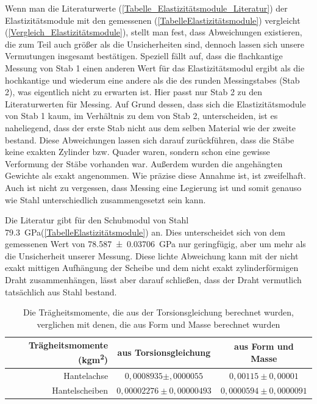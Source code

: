 \documentclass[
	a4paper,
	12pt,
	pagesize,
	ngerman
]{scrartcl}
\begin{document}
	Wenn man die Literaturwerte (\cref{Tabelle_Elastizitätsmodule_Literatur}) der Elastizitätsmodule mit den gemessenen (\cref{TabelleElastizitätsmodule}) vergleicht (\cref{Vergleich_Elastizitätsmodule}), stellt man fest, dass Abweichungen existieren, die zum Teil auch größer als die Unsicherheiten sind, dennoch lassen sich unsere Vermutungen insgesamt bestätigen. Speziell fällt auf, dass die flachkantige Messung von Stab 1 einen anderen Wert für das Elastizitätsmodul ergibt als die hochkantige und wiederum eine andere als die des runden Messingstabes (Stab 2), was eigentlich nicht zu erwarten ist. Hier passt nur Stab 2 zu den Literaturwerten für Messing. 
	Auf Grund dessen, dass sich die Elastizitätsmodule von Stab 1 kaum, im Verhältnis zu dem von Stab 2, unterscheiden, ist es naheliegend, dass der erste Stab nicht aus dem selben Material wie der zweite bestand.
	Diese Abweichungen lassen sich darauf zurückführen, dass die Stäbe keine exakten Zylinder bzw. Quader waren, sondern schon eine gewisse Verformung der Stäbe vorhanden war. Außerdem wurden die angehängten Gewichte als exakt angenommen. Wie präzise diese Annahme ist, ist zweifelhaft. Auch ist nicht zu vergessen, dass Messing eine Legierung ist und somit genauso wie Stahl unterschiedlich zusammengesetzt sein kann.
	\par
	Die Literatur gibt für den Schubmodul von Stahl \SI{79,3}{\giga \pascal}(\cref{TabelleElastizitätsmodule}) an. Dies unterscheidet sich von dem gemessenen Wert von \SI{78,587\pm 0,03706}{\giga \pascal} nur geringfügig, aber um mehr als die Unsicherheit unserer Messung. Diese lichte Abweichung kann mit der nicht exakt mittigen Aufhängung der Scheibe und dem nicht exakt zylinderförmigen Draht zusammenhängen, lässt aber darauf schließen, dass der Draht vermutlich tatsächlich aus Stahl bestand.
	\par
	\begin{table}[tb]
		\centering
		\begin{tabular}{ r | c | c |}
			Trägheitsmomente (\si{kgm^2})& aus Torsionsgleichung & aus Form und Masse\\ \hline
			Hantelachse & $0,0008935 \pm ,0000055$ &$ 0,00115 \pm0,00001$\\
			Hantelscheiben & $0,00002276 \pm 0,00000493$ & $0,0000594\pm 0,0000091$\\ \hline
		\end{tabular}
		\caption{Die Trägheitsmomente, die aus der Torsionsgleichung berechnet wurden, verglichen mit denen, die aus Form und Masse berechnet wurden}
		\label{Trägheitsmomente_Vergleich} 
	\end{table}
	
\end{document}
